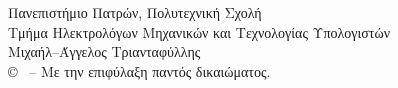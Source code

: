 \pagestyle{empty}

\vspace*{\fill}
\hline
\begin{flushleft}
	Πανεπιστήμιο Πατρών, Πολυτεχνική Σχολή \\
	Τμήμα Ηλεκτρολόγων Μηχανικών και Τεχνολογίας Υπολογιστών \\
	{Μιχαήλ--Άγγελος Τριανταφύλλης} \\
	© \monthyear \ -- Με την επιφύλαξη παντός δικαιώματος.\\
\end{flushleft}
\hline
